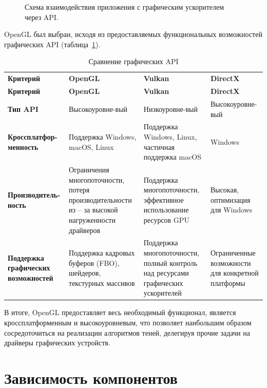 \begin{figure}[h!]
    \centering
    
    \caption{Схема взаимодействия приложения с графическим ускорителем через API.}
    \label{img:cpu_gpu_interaction}
\end{figure}

OpenGL был выбран, исходя из предоставляемых функциональных возможностей
графических API (таблица~\ref{tab:api_comparison}).

\begin{longtable}{|p{4cm}|p{3.8cm}|p{3.8cm}|p{3.8cm}|}
\captionsetup{justification=raggedright,singlelinecheck=false}
\caption{Сравнение графических API} \label{tab:api_comparison} \\

\hline
\textbf{Критерий} & \textbf{OpenGL} & \textbf{Vulkan} & \textbf{DirectX} \\
\hline
\endfirsthead

\hline
\textbf{Критерий} & \textbf{OpenGL} & \textbf{Vulkan} & \textbf{DirectX} \\
\hline
\endhead

\hline
\endfoot

\hline
\textbf{Тип API} & Высокоуровне-вый & Низкоуровне-вый & Высокоуровне-вый \\
\hline
\textbf{Кроссплатфор-менность} & Поддержка Windows, macOS, Linux & Поддержка Windows, Linux, частичная поддержка macOS & Windows \\
\hline
\textbf{Производитель-ность} & Ограничения многопоточности, потеря производительности из -- за высокой нагруженности драйверов & Поддержка многопоточности, эффективное использование ресурсов GPU & Высокая, оптимизация для Windows \\
\hline
\textbf{Поддержка графических возможностей} & Поддержка кадровых буферов (FBO), шейдеров, текстурных массивов & Поддержка многопоточности, полный контроль над ресурсами графических ускорителей & Ограниченные возможности для конкретной платформы \\
\hline

\end{longtable}

В итоге, OpenGL предоставляет весь необходимый функционал,
является кроссплатформенным и высокоуровневым, что позволяет наибольшим
образом сосредоточиться на реализации алгоритмов теней, делегируя прочие задачи
на драйверы графических устройств.

\section{Зависимость компонентов}

